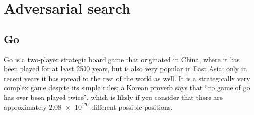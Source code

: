 \chapter{Adversarial search}\label{chap:5}
\section{Go}
Go is a two-player strategic board game that originated in China, where it has been played for at least \num{2500} years, but is also very popular in East Asia; only in recent years it has spread to the rest of the world as well. It is a strategically very complex game despite its simple rules; a Korean proverb says that ``no game of go has ever been played twice'', which is likely if you consider that there are approximately $\num{2.08e170}$ different possible positions.

